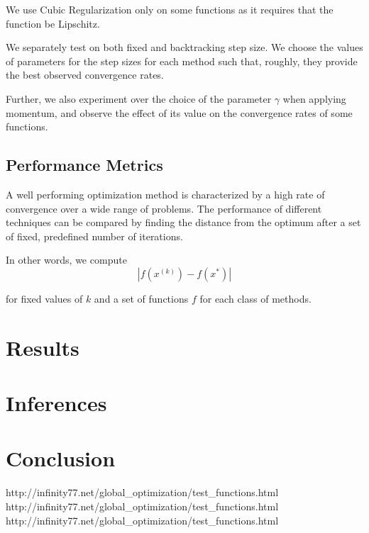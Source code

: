 \documentclass{article}
\begin{document}
We use Cubic Regularization only on some functions as it requires that the function be Lipschitz.

We separately test on both fixed and backtracking step size. We choose the values of parameters for the step sizes for each method such that, roughly, they provide the best observed convergence rates.

Further, we also experiment over the choice of the parameter $\gamma$ when applying momentum, and observe the effect of its value on the convergence rates of some functions.

\subsection{Performance Metrics}
A well performing optimization method is characterized by a high rate of convergence over a wide range of problems. The performance of different techniques can be compared by finding the distance from the optimum after a set of fixed, predefined number of iterations.

In other words, we compute
\begin{equation}
|f(x^{(k)}) - f(x^*)|
\end{equation}

for fixed values of $k$ and a set of functions $f$ for each class of methods.

\section{Results}\label{results}

\section{Inferences}\label{inferences}


\section{Conclusion}\label{conclusion}


http://infinity77.net/global\_optimization/test\_functions.html
http://infinity77.net/global\_optimization/test\_functions.html
http://infinity77.net/global\_optimization/test\_functions.html


\end{document}
